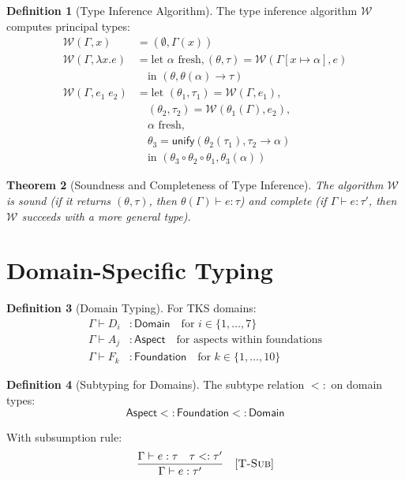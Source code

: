 \documentclass[11pt,twoside,openright]{book}
\theoremstyle{definition}
\newtheorem{definition}{Definition}[chapter]
\theoremstyle{plain}
\newtheorem{theorem}[definition]{Theorem}
\theoremstyle{remark}
\begin{document}
\begin{definition}[Type Inference Algorithm]
\label{def:type-inference}
The type inference algorithm $\mathcal{W}$ computes principal types:
\begin{align}
\mathcal{W}(\Gamma, x) &= (\emptyset, \Gamma(x)) \\
\mathcal{W}(\Gamma, \lambda x. e) &= \text{let } \alpha \text{ fresh}, (\theta, \tau) = \mathcal{W}(\Gamma[x \mapsto \alpha], e) \\
&\quad \text{in } (\theta, \theta(\alpha) \to \tau) \\
\mathcal{W}(\Gamma, e_1\; e_2) &= \text{let } (\theta_1, \tau_1) = \mathcal{W}(\Gamma, e_1), \\
&\quad (\theta_2, \tau_2) = \mathcal{W}(\theta_1(\Gamma), e_2), \\
&\quad \alpha \text{ fresh}, \\
&\quad \theta_3 = \mathsf{unify}(\theta_2(\tau_1), \tau_2 \to \alpha) \\
&\quad \text{in } (\theta_3 \circ \theta_2 \circ \theta_1, \theta_3(\alpha))
\end{align}
\end{definition}

\begin{theorem}[Soundness and Completeness of Type Inference]
\label{thm:inference-sound-complete}
The algorithm $\mathcal{W}$ is sound (if it returns $(\theta, \tau)$, then $\theta(\Gamma) \vdash e : \tau$) and complete (if $\Gamma \vdash e : \tau'$, then $\mathcal{W}$ succeeds with a more general type).
\end{theorem}

\section{Domain-Specific Typing}

\begin{definition}[Domain Typing]
\label{def:domain-typing}
For TKS domains:
\begin{align}
\Gamma \vdash D_i &: \mathsf{Domain} \quad \text{for } i \in \{1, \ldots, 7\} \\
\Gamma \vdash A_j &: \mathsf{Aspect} \quad \text{for aspects within foundations} \\
\Gamma \vdash F_k &: \mathsf{Foundation} \quad \text{for } k \in \{1, \ldots, 10\}
\end{align}
\end{definition}

\begin{definition}[Subtyping for Domains]
\label{def:domain-subtyping}
The subtype relation $<:$ on domain types:
\[
\mathsf{Aspect} <: \mathsf{Foundation} <: \mathsf{Domain}
\]

With subsumption rule:
\[
\frac{\Gamma \vdash e : \tau \quad \tau <: \tau'}{\Gamma \vdash e : \tau'} \quad [\textsc{T-Sub}]
\]
\end{definition}
\end{document}
